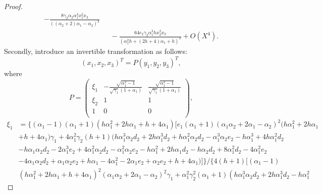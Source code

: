 \documentclass{ws-ijbc}
\begin{document}
\begin{proof}
\begin{equation*}
\begin{aligned}
-\frac{8 \gamma_{2} \alpha_{2} \alpha_{1}^{3}x_{1}^{2} x_{3} }{\left(\left(\alpha_{2}+2\right) \alpha_{1}-\alpha_{2}\right)^{3}}
\\&~~~
-\frac{64 e_{2} \gamma_{2}\alpha_{1}^{3} h x_{2}^{2} x_{3} }{\left(\alpha_{1}^{2} h +\left(2 h +4\right) \alpha_{1}+h \right)^{3}}+O \left(X^{4}\right).
\end{aligned}
\end{equation*}
Secondly, introduce an invertible transformation as follows:
\begin{equation*}
(x_{1},x_{2},x_{3})^{T}=P(y_{1},y_{2},y_{3})^{T},
 \end{equation*}
where
\begin{equation*}
P=\left(
  \begin{array}{ccc}
    \xi_{1} & -\frac{\sqrt{\alpha_{1}^2-1}}{\sqrt{\gamma_{1}}(1+\alpha_{1})}
    &\frac{\sqrt{\alpha_{1}^2-1}}{\sqrt{\gamma_{1}}(1+\alpha_{1})}  \\
    \xi_{2}& 1 & 1 \\
    1 & 0 & 0 \\
  \end{array}
\right),
        \end{equation*}
\begin{equation*}
\begin{aligned}
\xi_{1}&=\{\left(\alpha_{1}-1\right) \left(\alpha_{1}+1\right) \left(h \alpha_{1}^{2}+2 h \alpha_{1}+h +4 \alpha_{1}\right) [e_{1} \left(\alpha_{1}+1\right) \left(\alpha_{1} \alpha_{2}+2 \alpha_{1}-\alpha_{2}\right)^{2} (h \alpha_{1}^{2}+2 h \alpha_{1}
\\&
+h +4 \alpha_{1}) \gamma_{1}+4 \alpha_{1}^{2} \gamma_{2} \left(h +1\right)(h \alpha_{1}^{3} \alpha_{2} d_{2}+2 h \alpha_{1}^{3} d_{2}+h \alpha_{1}^{2} \alpha_{2} d_{2}-\alpha_{1}^{3} \alpha_{2} e_{2}-h \alpha_{1}^{3}+4 h \alpha_{1}^{2} d_{2}
\\&
-h \alpha_{1} \alpha_{2} d_{2}-2 \alpha_{1}^{3} e_{2}+4 \alpha_{1}^{2} \alpha_{2} d_{2}-\alpha_{1}^{2} \alpha_{2} e_{2}-h \alpha_{1}^{2}+2 h \alpha_{1} d_{2}-h \alpha_{2} d_{2}+8 \alpha_{1}^{2} d_{2}-4 \alpha_{1}^{2} e_{2}
\\&
-4 \alpha_{1} \alpha_{2} d_{2}+\alpha_{1} \alpha_{2} e_{2}+h \alpha_{1}-4 \alpha_{1}^{2}-2 \alpha_{1} e_{2}
+\alpha_{2} e_{2}+h +4 \alpha_{1})]\}/\{4 \left(h +1\right)[\left(\alpha_{1}-1\right)
\\&
 \left(h \alpha_{1}^{2}+2 h \alpha_{1}+h +4 \alpha_{1}\right)^{2}
 \left(\alpha_{1} \alpha_{2}+2 \alpha_{1}-\alpha_{2}\right)^{2}\gamma_{1}
 +\alpha_{1}^{2} \gamma_{2}^{2} \left(\alpha_{1}+1\right)\left(h \alpha_{1}^{3} \alpha_{2} d_{2}+2 h \alpha_{1}^{3} d_{2}-h \alpha_{1}^{2}

\end{aligned}
\end{equation*}
\end{proof}
\end{document}
